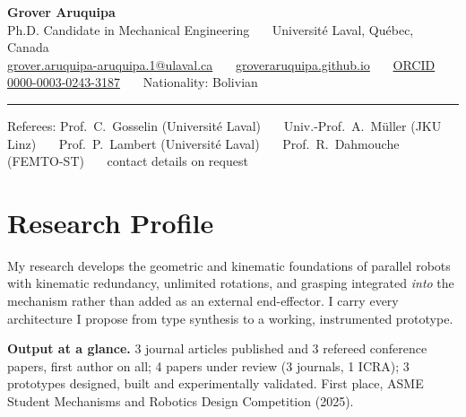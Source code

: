 \documentclass[11pt,letterpaper]{article}
\begin{document}
\begin{center}
{\LARGE\bfseries\color{ink} Grover Aruquipa}\\[4pt]
{\small Ph.D. Candidate in Mechanical Engineering \ \textbullet\ \ Universit\'e Laval, Qu\'ebec, Canada}\\[3pt]
{\footnotesize
\href{mailto:grover.aruquipa-aruquipa.1@ulaval.ca}{grover.aruquipa-aruquipa.1@ulaval.ca} \ \textbullet\ \
\href{https://groveraruquipa.github.io}{groveraruquipa.github.io} \ \textbullet\ \
\href{https://orcid.org/0000-0003-0243-3187}{ORCID 0000-0003-0243-3187} \ \textbullet\ \
Nationality: Bolivian}\\[4pt]
{\color{ink}\rule{0.55\linewidth}{1.1pt}}
\end{center}

\begin{center}
{\footnotesize\color{cap} Referees: Prof.~C.~Gosselin (Universit\'e Laval) \ \textbullet\ \
Univ.-Prof.~A.~M\"uller (JKU Linz) \ \textbullet\ \ Prof.~P.~Lambert (Universit\'e Laval) \ \textbullet\ \
Prof.~R.~Dahmouche (FEMTO-ST) \ \textbullet\ \ contact details on request}
\end{center}
\vspace{-4pt}

\section{Research Profile}
{\footnotesize My research develops the geometric and kinematic foundations of parallel robots with kinematic
redundancy, unlimited rotations, and grasping integrated \emph{into} the mechanism rather than added as an external
end-effector. I carry every architecture I propose from type synthesis to a working, instrumented prototype.\par
\vspace{3pt}
\textbf{Output at a glance.} 3 journal articles published and 3 refereed conference papers, first author on all;
4 papers under review (3 journals, 1 ICRA); 3 prototypes designed, built and experimentally validated. First place,
ASME Student Mechanisms and Robotics Design Competition (2025).}

\end{document}
